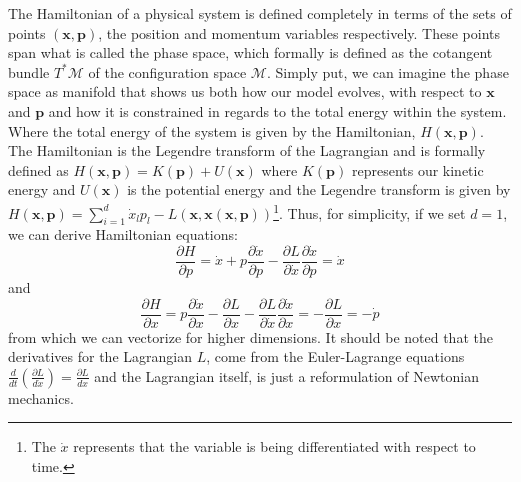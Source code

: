 \documentclass[twoside]{article}
\begin{document}
The Hamiltonian of a physical system is defined completely in terms of the sets of points $(\textbf{x}, \textbf{p})$, the position and momentum variables respectively. These points span what is called the phase space, which formally is defined as the cotangent bundle $T^{*}\mathcal{M}$ of the configuration space $\mathcal{M}$. Simply put, we can imagine the phase space as manifold that shows us both how our model evolves, with respect to $\textbf{x}$ and $\textbf{p}$ and how it is constrained in regards to the total energy within the system. Where the total energy of the system is given by the Hamiltonian, $H(\textbf{x},\textbf{p})$. The Hamiltonian is the Legendre transform of the Lagrangian and is formally defined as $
H(\textbf{x}, \textbf{p})  = K(\textbf{p}) + U(\textbf{x})$ where $K(\textbf{p})$ represents our kinetic energy and $U(\textbf{x})$ is the potential energy and the Legendre transform is given by $H(\textbf{x},\textbf{p}) = \sum_{i = 1}^{d}\dot{x}_{l}p_{l} - L(\textbf{x}, \textbf{\.{x}}(\textbf{x}, \textbf{p})) $\footnote{The $\dot{x}$ represents that the variable is being differentiated with respect to time.}.  
Thus, for simplicity, if we set $d = 1$, we can derive Hamiltonian equations: 
\begin{equation}
\label{eq:hameq1}
\frac{\partial H}{\partial p} = \dot{x} + p\frac{\partial \dot{x}}{\partial p} - \frac{\partial L}{\partial \dot{x}}\frac{\partial \dot{x}}{\partial p} = \dot{x} 
\end{equation}
and 
\begin{equation}
\label{eq:hameq2}
\frac{\partial H}{\partial x} = p\frac{\partial \dot{x}}{\partial x} - \frac{\partial L}{\partial x} - \frac{\partial L}{\partial \dot{x}}\frac{\partial \dot{x}}{\partial x} = - \frac{\partial L}{\partial x}= -\dot{p}  
\end{equation}
from which we can vectorize for higher dimensions. It should be noted that the derivatives for the Lagrangian $L$, come from the Euler-Lagrange equations $\frac{d}{dt}\left(\frac{\partial L}{d\dot{x}}\right) = \frac{\partial L}{dx}$ and the Lagrangian itself, is just a reformulation of Newtonian mechanics.
\end{document}
